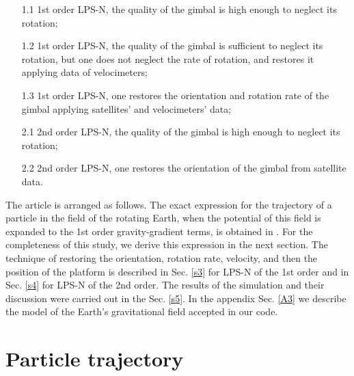 \documentclass[twocolumn,showpacs,preprintnumbers]{revtex4}
\begin{document}
\begin{enumerate}
\item[1.1] 1st order LPS-N, the quality of the gimbal is high enough to
neglect its rotation;

\item[1.2] 1st order LPS-N, the quality of the gimbal is sufficient to
neglect its rotation, but one does not neglect the rate of rotation, and
restores it applying data of velocimeters;

\item[1.3] 1st order LPS-N, one restores the orientation and rotation rate
of the gimbal applying satellites' and velocimeters' data;

\item[2.1] 2nd order LPS-N, the quality of the gimbal is high enough to
neglect its rotation;

\item[2.2] 2nd order LPS-N, one restores the orientation of the gimbal from
satellite data.
\end{enumerate}

The article is arranged as follows. The exact expression for the trajectory
of a particle in the field of the rotating Earth, when the potential of this
field is expanded to the 1st order gravity-gradient terms, is obtained in 
\cite{c11}. For the completeness of this study, we derive this expression in
the next section. The technique of restoring the orientation, rotation rate,
velocity, and then the position of the platform is described in Sec. \ref{s3}
for LPS-N of the 1st order and in Sec. \ref{s4} for LPS-N of the 2nd order.
The results of the simulation and their discussion were carried out in the
Sec. \ref{s5}. In the appendix Sec. \ref{A3} we describe the model of the
Earth's gravitational field accepted in our code.

\section{\label{s2}Particle trajectory}
\end{document}
